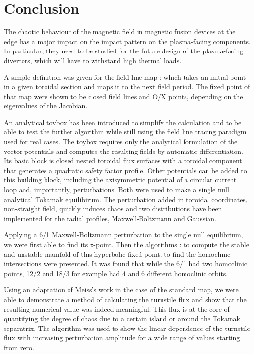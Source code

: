 \chapter{Conclusion}

The chaotic behaviour of the magnetic field in magnetic fusion devices at the edge has a major impact on the impact pattern on the plasma-facing components. In particular, they need to be studied for the future design of the plasma-facing divertors, which will have to withstand high thermal loads.

A simple definition was given for the field line map : which takes an initial point in a given toroidal section and maps it to the next field period. The fixed point of that map were shown to be closed field lines and O/X points, depending on the eigenvalues of the Jacobian.

An analytical toybox has been introduced to simplify the calculation and to be able to test the further algorithm while still using the field line tracing paradigm used for real cases. The toybox requires only the analytical formulation of the vector potentials and computes the resulting fields by automatic differentiation. Its basic block is closed nested toroidal flux surfaces with a toroidal component that generates a quadratic safety factor profile. Other potentials can be added to this building block, including the axisymmetric potential of a circular current loop and, importantly, perturbations. Both were used to make a single null analytical Tokamak equilibirum. The perturbation added in toroidal coordinates, non-straight field, quickly induces chaos and two distributions have been implemented for the radial profiles, Maxwell-Boltzmann and Gaussian. 

Applying a 6/1 Maxwell-Boltzmann perturbation to the single null equilibrium, we were first able to find its x-point. Then the algorithms : to compute the stable and unstable manifold of this hyperbolic fixed point. to find the homoclinic intersections were presented. It was found that while the 6/1 had two homoclinic points, 12/2 and 18/3 for example had 4 and 6 different homoclinic orbits.

Using an adaptation of Meiss's work in the case of the standard map, we were able to demonstrate a method of calculating the turnstile flux and show that the resulting numerical value was indeed meaningful. This flux is at the core of quantifying the degree of chaos due to a certain island or around the Tokamak separatrix. The algorithm was used to show the linear dependence of the turnstile flux with increasing perturbation amplitude for a wide range of values starting from zero. 

